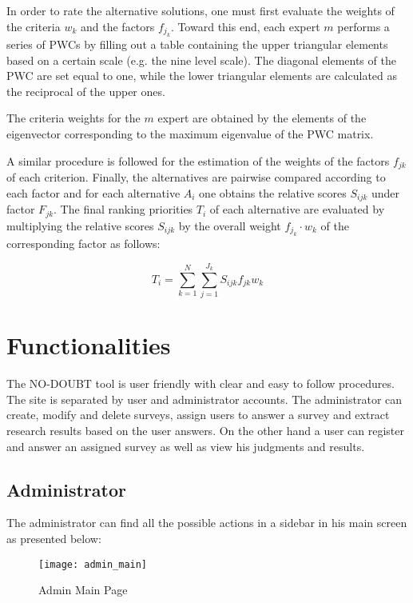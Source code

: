 \documentclass{article}
\begin{document}
In order to rate the alternative solutions, one must first evaluate the weights of the criteria $w_k$ and the factors $f_{j_k}$. Toward this end, each expert $m$ performs a series of PWCs by filling out a table containing the upper triangular elements based on a certain scale (e.g. the nine level scale). The diagonal elements of the PWC are set equal to one, while the lower triangular elements are calculated as the reciprocal of the upper ones.

The criteria weights for the $m$ expert are obtained by the elements of the eigenvector corresponding to the maximum eigenvalue of the PWC matrix. 

A similar procedure is followed for the estimation of the weights of the factors $f_{jk}$ of each criterion. Finally, the alternatives are pairwise compared according to each factor and for each alternative $A_i$ one obtains the relative scores $S_{ijk}$ under factor $F_{jk}$. The final ranking priorities $T_i$ of each alternative are evaluated by multiplying the relative scores $S_{ijk}$ by the overall weight $f_{j_k} · w_k$ of the corresponding factor as follows:

\begin{equation}
    T_i=\sum_{k=1}^{N}\sum_{j=1}^{J_k}S_{ijk} f_{jk} w_k
\end{equation}

\section*{Functionalities}
The NO-DOUBT tool is user friendly with clear and easy to follow procedures. The site is separated by user and administrator accounts. 
The administrator can create, modify and delete surveys, assign users to answer a survey and extract research results based on the user answers. On the other hand a user can register and answer an assigned survey as well as view his judgments and results.


\subsection*{Administrator}

The administrator can find all the possible actions in a sidebar in his main screen as presented below:

\begin{figure}[h!]
\centering
\texttt{[image: admin\_main]}
\caption{Admin Main Page}
\label{fig:admin_main}
\end{figure}
\end{document}
